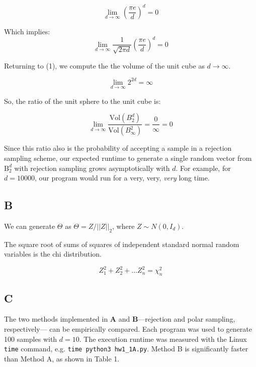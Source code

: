 \documentclass{article}
\begin{document}
\begin{equation}
\lim_{d \to \infty} \left( \frac{\pi e}{d} \right)^d = 0
\end{equation}

Which implies:
\begin{equation}
\lim_{d \to \infty} \frac{1}{\sqrt{2\pi d}} \left( \frac{\pi e}{d} \right)^d = 0
\end{equation}

Returning to (1), we compute the the volume of the unit cube as $d \to \infty$.

\begin{equation}
\lim_{d \to \infty} 2^{2d} = \infty
\end{equation}

So, the ratio of the unit sphere to the unit cube is:

\begin{equation}
\lim_{d \to \infty} \frac{\mathrm{Vol}(B^d_2)}{\mathrm{Vol}(B^2_\infty)} =
\frac{0}{\infty} = 0
\end{equation}

Since this ratio also is the probability of accepting a sample in a rejection sampling
scheme, our expected runtime to generate a single random vector from $\mathrm{B}^d_2$ with
rejection sampling grows asymptotically with $d$. For example, for $d=10000$, our
program would run for a very, very, \textit{very} long time. 

\subsection*{B}
We can generate $\Theta$ as $\Theta = Z / ||Z||_2$, where $Z \sim N(0, I_d)$.

\smallskip

The square root of sums of squares of independent standard normal random
variables is the chi distribution. 

\begin{equation}
	Z^2_1 + Z^2_2 + ... Z^2_n = \chi^2_n
\end{equation}

\subsection*{C}

The two methods implemented in \textbf{A} and \textbf{B}---rejection and polar
sampling, respectively--- can be empirically
compared. Each program was used to generate 100 samples with $d=10$. The
execution runtime was measured with the Linux \texttt{time} command, e.g.
\texttt{time python3 hw1\_1A.py}. Method B is significantly faster than Method
A, as shown in Table 1.
\end{document}
